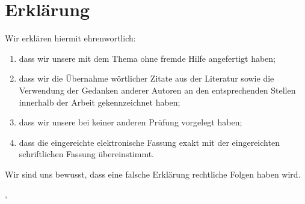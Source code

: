 \thispagestyle{empty}

\section*{Erkl\"arung}
\vspace*{2em}

Wir erkl\"aren hiermit ehrenwortlich:
\begin{enumerate}
\item dass wir unsere {\arbeit} mit dem Thema
{\itshape \pdftitel } ohne fremde Hilfe angefertigt haben;
\item dass wir die \"Ubernahme w\"ortlicher Zitate aus der Literatur sowie die Verwendung der Gedanken
anderer Autoren an den entsprechenden Stellen innerhalb der Arbeit gekennzeichnet haben;
\item dass wir unsere {\arbeit} bei keiner anderen Pr\"ufung vorgelegt haben;
\item dass die eingereichte elektronische Fassung exakt mit der eingereichten schriftlichen Fassung
\"ubereinstimmt.
\end{enumerate}

Wir sind uns bewusst, dass eine falsche Erkl\"arung rechtliche Folgen haben wird.

\vspace{3em}

\abgabeort, \datumAbgabe
\vspace{4em}

\autor
